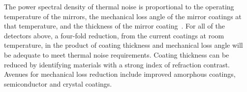 

The power spectral density of thermal noise is proportional to the operating temperature of the mirrors, the mechanical loss angle of the mirror coatings at that temperature, and the thickness of the mirror coating~\cite{levin1998internal}. 
For all of the detectors above, a four-fold reduction, from the current coatings at room temperature, in the product of coating thickness and mechanical loss angle will be adequate to meet thermal noise requirements. Coating thickness can be reduced by identifying materials with a strong index of refraction contrast. Avenues for mechanical loss reduction include improved amorphous coatings, semiconductor and crystal coatings.





